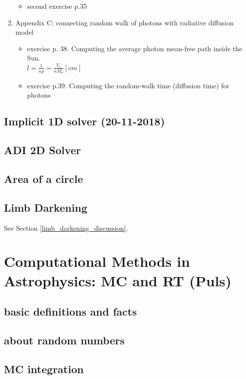 \documentclass[10pt,a4paper]{article}
\begin{document}
\begin{enumerate}
\begin{itemize}
\begin{itemize}
\end{itemize}

\item second exercise p.35
\end{itemize}

\item Appendix C: connecting random walk of photons with radiative diffusion model
\begin{itemize}
\item exercise p. 38. Computing the average photon mean-free path inside the Sun. \\
$l = \frac{1}{\kappa \rho} = \frac{V_o}{\kappa M_o} [cm]$

\item exercise p.39. Computing the random-walk time (diffusion time) for photons

\end{itemize}


\end{enumerate}

\subsection{Implicit 1D solver (20-11-2018)}
\subsection{ADI 2D Solver}
\subsection{Area of a circle}
\subsection{Limb Darkening}
See Section \ref{limb_darkening_discussion}.

\newpage
\section{Computational Methods in Astrophysics: MC and RT (Puls)}
\subsection{basic definitions and facts}
\subsection{about random numbers}
\subsection{MC integration}
\end{document}
